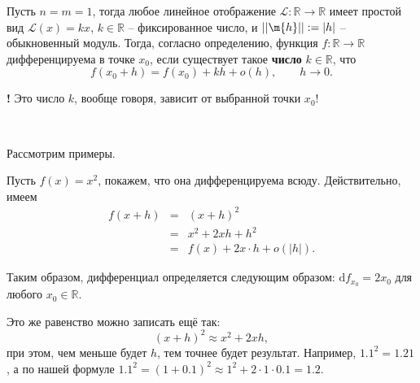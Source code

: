 Пусть $n=m=1$, тогда любое линейное отображение $\mathscr{L}:\mathbb{R} \to \mathbb{R}$ имеет простой вид $\mathscr{L}(x) = kx$, $k \in \mathbb{R}$ -- фиксированное число, и $||\m{h}|| : = |h|$ -- обыкновенный модуль. Тогда, согласно определению, функция $f:\mathbb{R} \to \mathbb{R}$ дифференцируема в точке $x_0$, если существует такое \textbf{число} $k\in \mathbb{R}$, что
\[
 f(x_0+h) = f(x_0)+kh + o(h), \qquad h \to 0.
\]

\begin{mydanger}{\bf{!}}
 Это число $k$, вообще говоря, зависит от выбранной точки $x_0$! 
\end{mydanger}~

Рассмотрим примеры.

\begin{example}
    Пусть $f(x) = x^2$, покажем, что она дифференцируема всюду. Действительно, имеем
     \begin{eqnarray*}
         f(x+h) &=& (x+h)^2 \\
         &=& x^2 + 2xh + h^2 \\
        &=& f(x) + 2x \cdot h + o(|h|).
     \end{eqnarray*}

Таким образом, дифференциал определяется следующим образом: $\mathrm{d}f_{x_0} = 2x_0$ для любого $x_0 \in \mathbb{R}$.

Это же равенство можно записать ещё так:
\[
 (x+h)^2 \approx x^2 + 2xh,
\]
при этом, чем меньше будет $h$, тем точнее будет результат. Например, $1.1^2 =1.21$, а по нашей формуле $1.1^2 = (1+0.1)^2 \approx 1^2+ 2\cdot 1 \cdot 0.1 = 1.2.$
\end{example}

